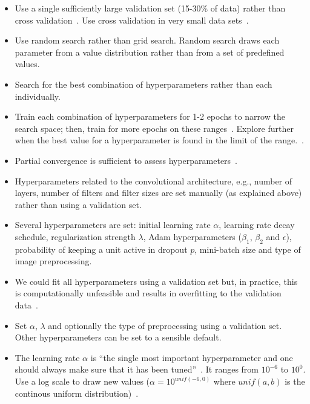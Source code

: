 \begin{itemize}
	\item Use a single sufficiently large validation set (15-30\% of data) rather than cross validation~\cite{Bengio2014}. Use cross validation in very small data sets~\cite{Ng2014}.

	\item Use random search rather than grid search. Random search draws each parameter from a value distribution rather than from a set of predefined values.~\cite{Bergstra2012}

	\item Search for the best combination of hyperparameters rather than each individually.

	\item Train each combination of hyperparameters for 1-2 epochs to narrow the search space; then, train for more epochs on these ranges~\cite{Karpathy2016}. Explore further when the best value for a hyperparameter is found in the limit of the range.~\cite{Bengio2012}.

	\item Partial convergence is sufficient to assess hyperparameters~\cite{Karpathy2016}.

	\item Hyperparameters related to the convolutional architecture, e.g., number of layers, number of filters and filter sizes are set manually (as explained above) rather than using a validation set.

	\item Several hyperparameters are set: initial learning rate $\alpha$, learning rate decay schedule, regularization strength $\lambda$, Adam hyperparameters ($\beta_1$, $\beta_2$ and $\epsilon$), probability of keeping a unit active in dropout $p$, mini-batch size and type of image preprocessing.

	\item We could fit all hyperparameters using a validation set but, in practice, this is computationally unfeasible and results in overfitting to the validation data~\cite{Cawley2010}.

	\item Set $\alpha$, $\lambda$ and optionally the type of preprocessing using a validation set. Other hyperparameters can be set to a sensible default. 

	\item The learning rate $\alpha$ is ``the single most important hyperparameter and one should always make sure that it has been tuned''~\cite{Bengio2012}. It ranges from $10^{-6}$ to $10^{0}$. Use a log scale to draw new values ($\alpha = 10^{unif(-6, 0)}$ where $unif(a,b)$ is the continous uniform distribution)~\cite{Karpathy2016}.


\end{itemize}
